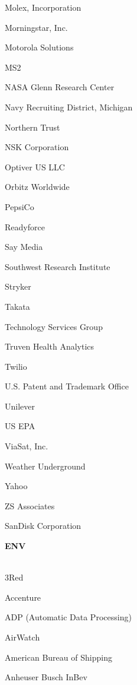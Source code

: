 \documentclass[twoside]{article}
\begin{document}
\begin{center}
\begin{multicols}{5}
\begin{FlushLeft}
\begin{compactitem}
\item Molex, Incorporation
\item Morningstar, Inc.
\item Motorola Solutions
\item MS2
\item NASA Glenn Research Center
\item Navy Recruiting District, Michigan
\item Northern Trust
\item NSK Corporation
\item Optiver US LLC
\item Orbitz Worldwide
\item PepsiCo
\item Readyforce
\item Say Media
\item Southwest Research Institute
\item Stryker
\item Takata
\item Technology Services Group
\item Truven Health Analytics
\item Twilio
\item U.S. Patent and Trademark Office
\item Unilever
\item US EPA
\item ViaSat, Inc.
\item Weather Underground
\item Yahoo
\item ZS Associates
\item SanDisk Corporation
\end{compactitem}
        \end{FlushLeft}
        \vspace{1em}
        {\fontsize{14}{16}\selectfont \bf ENV}\\
        \vspace{-1em}
        ~\hrulefill~
        \vspace{-.9em}
        \begin{FlushLeft}
        \begin{compactitem}
        \item 3Red
\item Accenture
\item ADP (Automatic Data Processing)
\item AirWatch
\item American Bureau of Shipping
\item Anheuser Busch InBev

\end{compactitem}
\end{FlushLeft}
\end{multicols}
\end{center}
\end{document}
